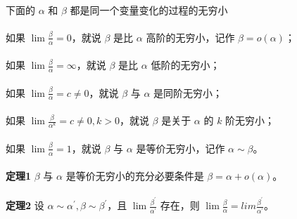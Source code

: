 \paragraph{}
下面的 $\alpha$ 和 $\beta$ 都是同一个变量变化的过程的无穷小

\paragraph{}
如果 $\lim \frac{\beta}{\alpha} = 0$，就说 $\beta$ 是比 $\alpha$ 高阶的无穷小，记作 $\beta = o(\alpha)$；

\paragraph{}
如果 $\lim \frac{\beta}{\alpha} = \infty$，就说 $\beta$ 是比 $\alpha$ 低阶的无穷小；

\paragraph{}
如果 $\lim \frac{\beta}{\alpha} = c \neq 0$，就说 $\beta$ 与 $\alpha$ 是同阶无穷小；

\paragraph{}
如果 $\lim \frac{\beta}{\alpha^k} = c \neq 0, k > 0$，就说 $\beta$ 是关于 $\alpha$ 的 $k$ 阶无穷小；

\paragraph{}
如果 $\lim \frac{\beta}{\alpha} = 1$，就说 $\beta$ 与 $\alpha$ 是等价无穷小，记作 $\alpha \sim \beta$。

\paragraph{}
\textbf{定理1} $\beta$ 与 $\alpha$ 是等价无穷小的充分必要条件是 $\beta = \alpha + o(\alpha)$。

\paragraph{}
\textbf{定理2} 设 $\alpha \sim \alpha^\prime, \beta \sim \beta^\prime$，且 $\lim \frac{\beta^\prime}{\alpha^\prime}$ 存在，则 $\lim \frac{\beta}{\alpha} = lim \frac{\beta^\prime}{\alpha^\prime}$。
